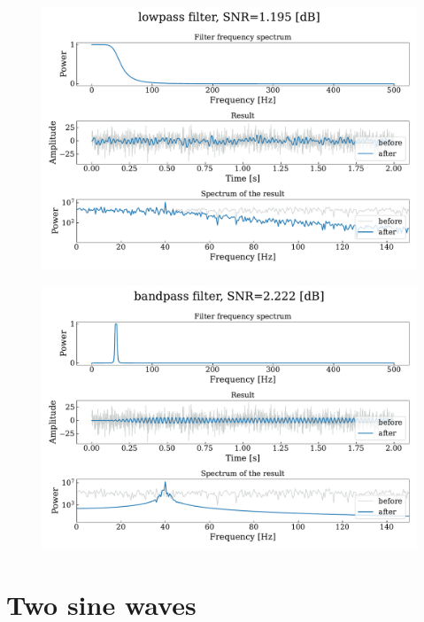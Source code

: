 \documentclass[13pt,a4paper]{article}
\begin{document}
\begin{figure}[ht!]
    \centering
    \includegraphics[width=0.9\linewidth]{iir.lowpass.pdf}
\end{figure}

\begin{figure}[ht!]
    \centering
    \includegraphics[width=0.9\linewidth]{iir.bandpass.pdf}
\end{figure}


\section{Two sine waves}
\end{document}
